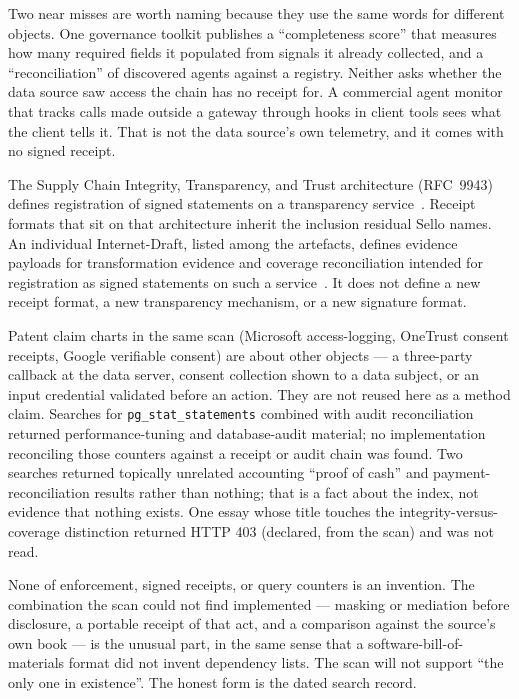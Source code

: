 \documentclass[11pt]{article}
\begin{document}
Two near misses are worth naming because they use the same words for different objects. One governance toolkit publishes a ``completeness score'' that measures how many required fields it populated from signals it already collected, and a ``reconciliation'' of discovered agents against a registry. Neither asks whether the data source saw access the chain has no receipt for. A commercial agent monitor that tracks calls made outside a gateway through hooks in client tools sees what the client tells it. That is not the data source's own telemetry, and it comes with no signed receipt.

The Supply Chain Integrity, Transparency, and Trust architecture (RFC~9943) defines registration of signed statements on a transparency service~\cite{rfc9943}. Receipt formats that sit on that architecture inherit the inclusion residual Sello names. An individual Internet-Draft, listed among the artefacts, defines evidence payloads for transformation evidence and coverage reconciliation intended for registration as signed statements on such a service~\cite{draft-dogru-scitt-07}. It does not define a new receipt format, a new transparency mechanism, or a new signature format.

Patent claim charts in the same scan (Microsoft access-logging, OneTrust consent receipts, Google verifiable consent) are about other objects --- a three-party callback at the data server, consent collection shown to a data subject, or an input credential validated before an action. They are not reused here as a method claim. Searches for \texttt{pg\_stat\_statements} combined with audit reconciliation returned performance-tuning and database-audit material; no implementation reconciling those counters against a receipt or audit chain was found. Two searches returned topically unrelated accounting ``proof of cash'' and payment-reconciliation results rather than nothing; that is a fact about the index, not evidence that nothing exists. One essay whose title touches the integrity-versus-coverage distinction returned HTTP 403 (declared, from the scan) and was not read.

None of enforcement, signed receipts, or query counters is an invention. The combination the scan could not find implemented --- masking or mediation before disclosure, a portable receipt of that act, and a comparison against the source's own book --- is the unusual part, in the same sense that a software-bill-of-materials format did not invent dependency lists. The scan will not support ``the only one in existence''. The honest form is the dated search record.
\end{document}
